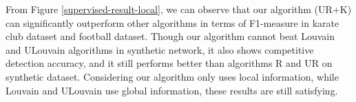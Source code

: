 \documentclass[\main/thesis.tex]{subfiles}
\begin{document}

From Figure \ref{supervised-result-local}, we can observe that our algorithm (UR+K) can significantly outperform other algorithms in terms of F1-measure in karate club dataset and football dataset. Though our algorithm cannot beat Louvain and ULouvain algorithms in synthetic network, it also shows competitive detection accuracy, and it still performs better than algorithms R and UR on synthetic dataset. Considering our algorithm only uses local information, while Louvain and ULouvain use global information, these results are still satisfying. %


\end{document}
